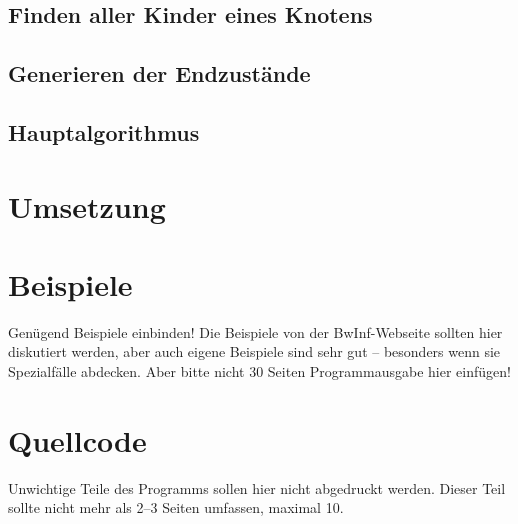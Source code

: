 \documentclass[a4paper,10pt,ngerman]{scrartcl}
\begin{document}
\subsection{Finden aller Kinder eines Knotens} \label{childGen}

\subsection{Generieren der Endzustände} \label{endingStates}

\subsection{Hauptalgorithmus}

\section{Umsetzung}

\section{Beispiele}

Genügend Beispiele einbinden! Die Beispiele von der BwInf-Webseite sollten hier diskutiert werden, aber auch eigene Beispiele sind sehr gut – besonders wenn sie Spezialfälle abdecken. Aber bitte nicht 30 Seiten Programmausgabe hier einfügen!

\section{Quellcode}

Unwichtige Teile des Programms sollen hier nicht abgedruckt werden. Dieser Teil sollte nicht mehr als 2–3 Seiten umfassen, maximal 10.
\end{document}
